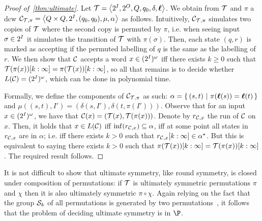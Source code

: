 \begin{proof}[Proof of~\cref{thm:ultimate}]
Let $\mathcal{T}=\left< 2^{I},2^{O},Q,q_0,\delta,\boldsymbol{\ell}\right>$. We obtain from $\mathcal{T}$ and $\pi$ a \gls{dcw} $\mathcal{C}_{\mathcal{T},\pi}=\left< Q\times Q,2^{I},(q_0, q_0),\mu,\alpha\right>$ as follows. Intuitively, $\mathcal{C}_{\mathcal{T},\pi}$ simulates two copies of $\mathcal{T}$ where the second copy is permuted by $\pi$, i.e. when seeing input $\sigma\in 2^{I}$ it simulates the transition of $\mathcal{T}$ with $\pi(\sigma)$. Then, each state $(q,r)$ is marked as accepting if the permuted labelling of $q$ is the same as the labelling of $r$.
We then show that $\mathcal{C}$ accepts a word $x\in (2^{I})^\omega$ iff there exists $k\ge 0$ such that $\mathcal{T}(\pi(x))[k:\infty] = \pi(\mathcal{T}(x))[k:\infty]$, so all that remains is to decide whether $L(\mathcal{C})=(2^{I})^\omega$, which can be done in polynomial time.

Formally, we define the components of $\mathcal{C}_{\mathcal{T}, \pi}$ as such: $\alpha=\left\{\,(s,t)\ \middle|\ \pi(\boldsymbol{\ell}(s))=\boldsymbol{\ell}(t)\,\right\}$ and $\mu\left((s,t),I'\right)=\left( \delta(s,I'), \delta(t, \pi(I')) \right)$. Observe that for an input $x\in (2^{I})^\omega$,
we have that $\mathcal{C}(x)=\left(\mathcal{T}(x), \mathcal{T}(\pi(x))\right)$.
Denote by $r_{\mathcal{C},x}$ the run of $\mathcal{C}$ on $x$. Then, it holds that $x\in L(\mathcal{C})$ iff $\inf(r_{\mathcal{C},x})\subseteq \alpha$, iff at some point all states in $r_{\mathcal{C},x}$ are in $\alpha$; i.e. iff there exists $k>0$ such that $r_{\mathcal{C},x}[k:\infty]\in \alpha^\star$. But this is equivalent to saying there exists $k>0$ such that $\pi(\mathcal{T}(x))[k:\infty] = \mathcal{T}(\pi(x))[k:\infty]$. The required result follows.
\end{proof}

It is not difficult to show that ultimate symmetry, like round symmetry, is closed under composition of permutations: if $\mathcal{T}$ is ultimately symmetric \WRT permutations $\pi$ and $\chi$ then it is also ultimately symmetric \WRT $\pi\circ\chi$. Again relying on the fact that the group $\mathcal{S}_k$ of all permutations is generated by two permutations~\cite{Cameron1999}, it follows that the problem of deciding ultimate symmetry is in $\P$.
